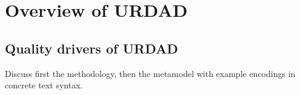 \section{Overview of URDAD}

\subsection{Quality drivers of URDAD}

Discuss first the methodology, then the metamodel with example encodings in concrete text syntax.